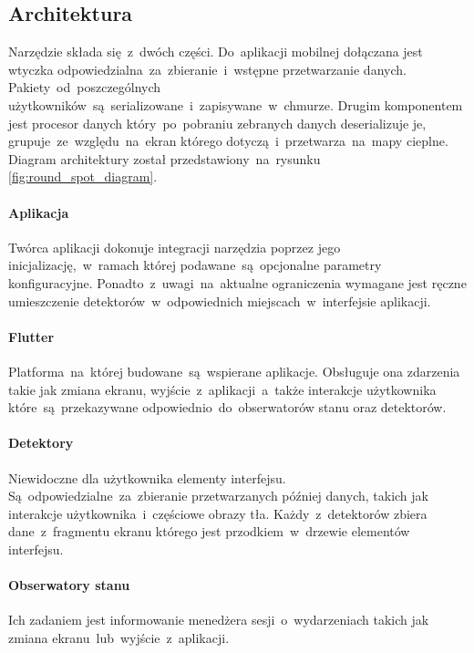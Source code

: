 \subsection{Architektura}
Narzędzie składa się~z~dwóch części. Do~aplikacji mobilnej dołączana jest wtyczka odpowiedzialna~za~zbieranie~i~wstępne przetwarzanie danych. Pakiety~od~poszczególnych użytkowników~są~serializowane~i~zapisywane~w~chmurze. Drugim komponentem jest procesor danych który~po~pobraniu zebranych danych deserializuje je, grupuje~ze~względu~na~ekran którego dotyczą~i~przetwarza~na~mapy cieplne. Diagram architektury został przedstawiony~na~rysunku \ref{fig:round_spot_diagram}.
\bigskip
{}

\paragraph{Aplikacja}
Twórca aplikacji dokonuje integracji narzędzia poprzez jego inicjalizację,~w~ramach której podawane~są~opcjonalne parametry konfiguracyjne. Ponadto~z~uwagi~na~aktualne ograniczenia wymagane jest ręczne umieszczenie detektorów~w~odpowiednich miejscach~w~interfejsie aplikacji.

\paragraph{Flutter} Platforma~na~której budowane~są~wspierane aplikacje. Obsługuje ona zdarzenia takie jak zmiana ekranu, wyjście~z~aplikacji~a~także interakcje użytkownika które~są~przekazywane odpowiednio~do~obserwatorów stanu oraz detektorów.

\paragraph{Detektory} 
\label{par:rs_detectors}
Niewidoczne dla użytkownika elementy interfejsu. Są~odpowiedzialne~za~zbieranie przetwarzanych później danych, takich jak interakcje użytkownika~i~częściowe obrazy tła. Każdy~z~detektorów zbiera dane~z~fragmentu ekranu którego jest przodkiem~w~drzewie elementów interfejsu.

\paragraph{Obserwatory stanu} 
\label{par:rs_observers}
Ich zadaniem jest informowanie menedżera sesji~o~wydarzeniach takich jak zmiana ekranu~lub~wyjście~z~aplikacji.

